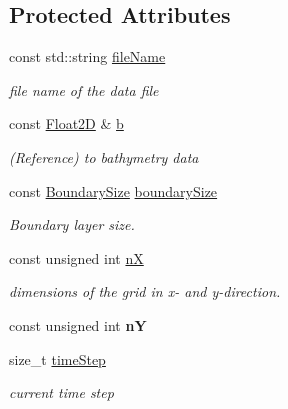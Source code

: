 \subsection*{Protected Attributes}
\begin{DoxyCompactItemize}
\item 
\hypertarget{classio_1_1Writer_a93b978e8cbfc6bcf6dbfdc3f393d300a}{const std\-::string \hyperlink{classio_1_1Writer_a93b978e8cbfc6bcf6dbfdc3f393d300a}{file\-Name}}\label{classio_1_1Writer_a93b978e8cbfc6bcf6dbfdc3f393d300a}

\begin{DoxyCompactList}\small\item\em file name of the data file \end{DoxyCompactList}\item 
\hypertarget{classio_1_1Writer_a1f5d4ab8728ae1c2ceba52c6c822d0bc}{const \hyperlink{classFloat2D}{Float2\-D} \& \hyperlink{classio_1_1Writer_a1f5d4ab8728ae1c2ceba52c6c822d0bc}{b}}\label{classio_1_1Writer_a1f5d4ab8728ae1c2ceba52c6c822d0bc}

\begin{DoxyCompactList}\small\item\em (Reference) to bathymetry data \end{DoxyCompactList}\item 
\hypertarget{classio_1_1Writer_a7cf701232192c20c41cbb4454601c219}{const \hyperlink{structio_1_1BoundarySize}{Boundary\-Size} \hyperlink{classio_1_1Writer_a7cf701232192c20c41cbb4454601c219}{boundary\-Size}}\label{classio_1_1Writer_a7cf701232192c20c41cbb4454601c219}

\begin{DoxyCompactList}\small\item\em Boundary layer size. \end{DoxyCompactList}\item 
\hypertarget{classio_1_1Writer_a080fc86da3b2d8ea130382917d96252d}{const unsigned int \hyperlink{classio_1_1Writer_a080fc86da3b2d8ea130382917d96252d}{n\-X}}\label{classio_1_1Writer_a080fc86da3b2d8ea130382917d96252d}

\begin{DoxyCompactList}\small\item\em dimensions of the grid in x-\/ and y-\/direction. \end{DoxyCompactList}\item 
\hypertarget{classio_1_1Writer_a8c4ceaedd4b3e571cc4a5cacbcb21604}{const unsigned int {\bfseries n\-Y}}\label{classio_1_1Writer_a8c4ceaedd4b3e571cc4a5cacbcb21604}

\item 
\hypertarget{classio_1_1Writer_aa21f3ee8a54cf9278d711fe4f454f45c}{size\-\_\-t \hyperlink{classio_1_1Writer_aa21f3ee8a54cf9278d711fe4f454f45c}{time\-Step}}\label{classio_1_1Writer_aa21f3ee8a54cf9278d711fe4f454f45c}

\begin{DoxyCompactList}\small\item\em current time step \end{DoxyCompactList}\end{DoxyCompactItemize}


